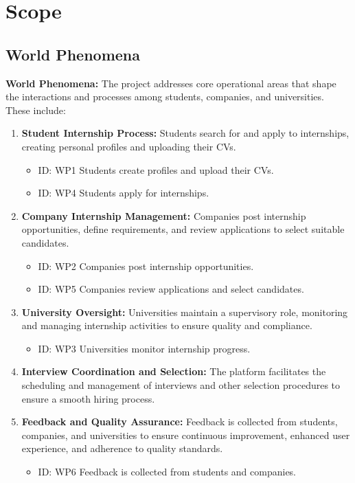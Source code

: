 \section{Scope}
\label{sec:scope}%
\subsection{World Phenomena}
\label{subsec:world_phenomena}%
\setcounter{wp}{1}
\newcommand{\cwp}{\thewp\stepcounter{wp}}
\textbf{World Phenomena:} 
The project addresses core operational areas that shape the interactions and processes among students, companies, and universities. These include:
\begin{enumerate}
    \item \textbf{Student Internship Process:} Students search for and apply to internships, creating personal profiles and uploading their CVs.
    \begin{itemize}
        \item ID: WP1 Students create profiles and upload their CVs.
        \item ID: WP4 Students apply for internships.
    \end{itemize}

    \item \textbf{Company Internship Management:} Companies post internship opportunities, define requirements, and review applications to select suitable candidates.
    \begin{itemize}
        \item ID: WP2 Companies post internship opportunities.
        \item ID: WP5 Companies review applications and select candidates.
    \end{itemize}

    \item \textbf{University Oversight:} Universities maintain a supervisory role, monitoring and managing internship activities to ensure quality and compliance.
    \begin{itemize}
        \item ID: WP3 Universities monitor internship progress.
    \end{itemize}

    \item \textbf{Interview Coordination and Selection:} The platform facilitates the scheduling and management of interviews and other selection procedures to ensure a smooth hiring process.

    \item \textbf{Feedback and Quality Assurance:} Feedback is collected from students, companies, and universities to ensure continuous improvement, enhanced user experience, and adherence to quality standards.
    \begin{itemize}
        \item ID: WP6 Feedback is collected from students and companies.
    \end{itemize}


\end{enumerate}
